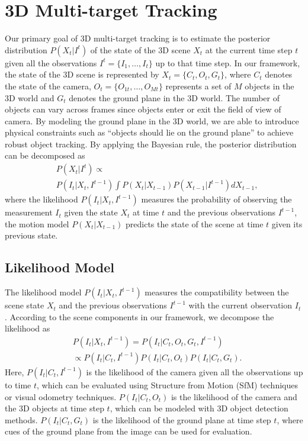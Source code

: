 \documentclass[10pt,column,letterpaper]{article}
\begin{document}
\section{3D Multi-target Tracking}

Our primary goal of 3D multi-target tracking is to estimate the posterior distribution $P(X_t | I^t)$ of the state of the 3D scene $X_t$ at the current time step $t$ given all the observations $I^t = \{ I_1, \ldots, I_t \}$ up to that time step. In our framework, the state of the 3D scene is represented by $X_t = \{ C_t, O_t, G_t \}$, where $C_t$ denotes the state of the camera, $O_t = \{ O_{1t}, \ldots, O_{Mt} \}$ represents a set of $M$ objects in the 3D world and $G_t$ denotes the ground plane in the 3D world. The number of objects can vary across frames since objects enter or exit the field of view of camera. By modeling the ground plane in the 3D world, we are able to introduce physical constraints such as ``objects should lie on the ground plane'' to achieve robust object tracking. By applying the Bayesian rule, the posterior distribution can be decomposed as
\begin{align}\label{eq:posterior}
    & P(X_t | I^t) \propto \\ & P(I_t | X_t, I^{t-1}) \int P(X_t | X_{t-1}) P(X_{t-1} | I^{t-1}) dX_{t-1}, \nonumber
\end{align}
where the likelihood $P(I_t | X_t, I^{t-1})$ measures the probability of observing the measurement $I_t$ given the state $X_t$ at time $t$ and the previous observations $I^{t-1}$, the motion model $P(X_t | X_{t-1})$ predicts the state of the scene at time $t$ given its previous state.

\subsection{Likelihood Model}

The likelihood model $P(I_t | X_t, I^{t-1})$ measures the compatibility between the scene state $X_t$ and the previous observations $I^{t-1}$ with the current observation $I_t$. According to the scene components in our framework, we decompose the likelihood as
\begin{align}\label{eq:likelihood}
     & P(I_t | X_t, I^{t-1})  =  P(I_t | C_t, O_t, G_t, I^{t-1}) \\
    & \propto P(I_t | C_t, I^{t-1}) P(I_t | C_t, O_t) P(I_t | C_t, G_t). \nonumber 
\end{align}
Here, $P(I_t | C_t, I^{t-1})$ is the likelihood of the camera given all the observations up to time $t$, which can be evaluated using Structure from Motion (SfM) techniques or visual odometry techniques. $P(I_t | C_t, O_t)$ is the likelihood of the camera and the 3D objects at time step $t$, which can be modeled with 3D object detection methods. $P(I_t | C_t, G_t)$ is the likelihood of the ground plane at time step $t$, where cues of the ground plane from the image can be used for evaluation.
\end{document}
